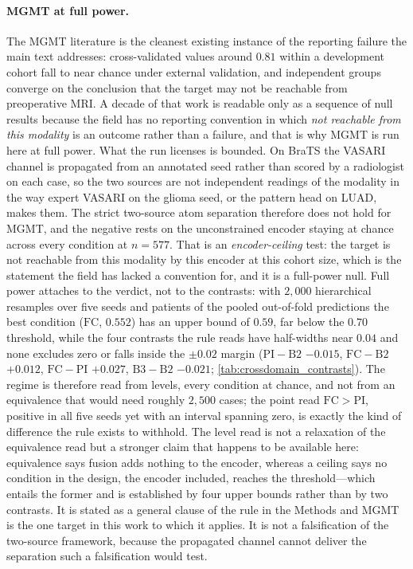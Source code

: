 \paragraph{MGMT at full power.}
The MGMT literature is the cleanest existing instance of the reporting
failure the main text addresses: cross-validated values around $0.81$
within a development cohort fall to near chance under external
validation,\cite{kim2022mgmtvalidation} and independent groups converge
on the conclusion that the target may not be reachable from
preoperative MRI.\cite{robinet2023mgmt,saeed2023mgmt} A decade of that
work is readable only as a sequence of null results because the field
has no reporting convention in which \emph{not reachable from this
modality} is an outcome rather than a failure, and that is why MGMT is
run here at full power. What the run licenses is bounded. On BraTS the
VASARI channel is propagated from an annotated seed rather than scored
by a radiologist on each case, so the two sources are not independent
readings of the modality in the way expert VASARI on the glioma seed,
or the pattern head on LUAD, makes them. The strict two-source atom
separation therefore does not hold for MGMT, and the negative rests on
the unconstrained encoder staying at chance across every condition at
$n\!=\!577$. That is an \emph{encoder-ceiling} test: the target is not
reachable from this modality by this encoder at this cohort size, which
is the statement the field has lacked a convention for, and it is a
full-power null. Full power attaches to the verdict, not to the
contrasts: with $2{,}000$ hierarchical resamples over five seeds and
patients of the pooled out-of-fold predictions the best condition
($\mathrm{FC}$, $0.552$) has an upper bound of $0.59$, far below the
$0.70$ threshold, while the four contrasts the rule reads have
half-widths near $0.04$ and none excludes zero or falls inside the
$\pm0.02$ margin ($\mathrm{PI}-\mathrm{B2}$ $-0.015$,
$\mathrm{FC}-\mathrm{B2}$ $+0.012$, $\mathrm{FC}-\mathrm{PI}$ $+0.027$,
$\mathrm{B3}-\mathrm{B2}$ $-0.021$; \cref{tab:crossdomain_contrasts}). The
regime is therefore read from levels, every condition at chance, and
not from an equivalence that would need roughly $2{,}500$ cases; the
point read $\mathrm{FC}>\mathrm{PI}$, positive in all five seeds yet
with an interval spanning zero, is exactly the kind of difference the
rule exists to withhold. The level read is not a relaxation of the
equivalence read but a stronger claim that happens to be available
here: equivalence says fusion adds nothing to the encoder, whereas a
ceiling says no condition in the design, the encoder included, reaches
the threshold---which entails the former and is established by four
upper bounds rather than by two contrasts. It is stated as a general
clause of the rule in the Methods and MGMT is the one target in this
work to which it applies. It is not a falsification of the two-source
framework, because the propagated channel cannot deliver the separation
such a falsification would test.


